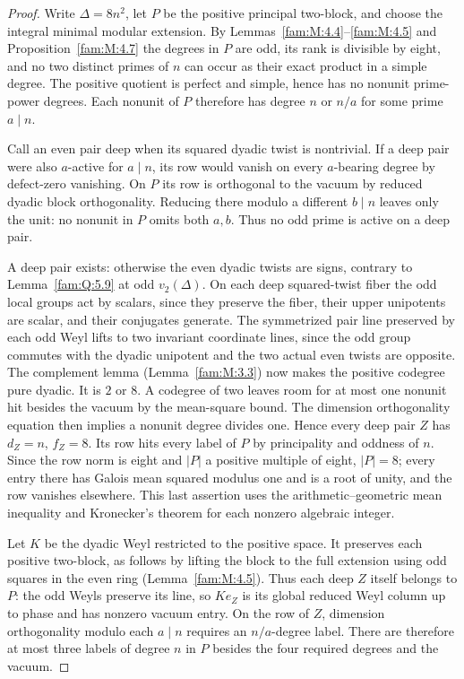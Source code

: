 \documentclass[11pt,a4paper]{article}
\numberwithin{equation}{section}
\theoremstyle{remark}
\begin{document}
\begin{proof}
Write $\Delta=8n^2$, let $P$ be the positive principal two-block,
and choose the integral minimal modular extension. By
Lemmas~\ref{fam:M:4.4}--\ref{fam:M:4.5} and Proposition~\ref{fam:M:4.7} the degrees in
$P$ are odd, its rank is divisible by eight, and no two distinct
primes of $n$ can occur as their exact product in a simple degree.
The positive quotient is perfect and simple, hence has no
nonunit prime-power degrees. Each nonunit of $P$ therefore has
degree $n$ or $n/a$ for some prime $a\mid n$.

Call an even pair deep when its squared dyadic twist is nontrivial.
If a deep pair were also $a$-active for $a\mid n$, its row would
vanish on every $a$-bearing degree by defect-zero vanishing. On
$P$ its row is orthogonal to the vacuum by reduced dyadic block
orthogonality. Reducing there modulo a different $b\mid n$
leaves only the unit: no nonunit in $P$ omits both $a,b$.
Thus no odd prime is active on a deep pair.

A deep pair exists: otherwise the even dyadic twists are signs,
contrary to Lemma~\ref{fam:Q:5.9}
at odd $v_2(\Delta)$. On each deep squared-twist fiber the odd
local groups act by scalars, since they preserve the fiber,
their upper unipotents are scalar, and their conjugates generate.
The symmetrized pair line preserved by each odd Weyl lifts to two
invariant coordinate lines, since the odd group commutes with the
dyadic unipotent and the two actual even twists are opposite.
The complement lemma (Lemma~\ref{fam:M:3.3}) now makes the
positive codegree pure dyadic. It is $2$ or $8$. A codegree of
two leaves room for at most one nonunit hit besides the vacuum
by the mean-square bound. The dimension orthogonality equation
then implies a nonunit degree divides one. Hence every deep pair
$Z$ has $d_Z=n$, $f_Z=8$. Its row hits every label of $P$ by
principality and oddness of $n$. Since the row norm is eight
and $|P|$ a positive multiple of eight, $|P|=8$; every entry
there has Galois mean squared modulus one and is a root of
unity, and the row vanishes elsewhere. This last assertion uses
the arithmetic--geometric mean inequality and Kronecker's
theorem for each nonzero algebraic integer.

Let $K$ be the dyadic Weyl restricted to the positive space.
It preserves each positive two-block, as follows by lifting the
block to the full extension using odd squares in the even ring
(Lemma~\ref{fam:M:4.5}). Thus each deep $Z$ itself belongs to $P$:
the odd Weyls preserve its line, so $K e_Z$ is its global reduced
Weyl column up to phase and has nonzero vacuum entry. On the
row of $Z$, dimension orthogonality modulo each $a\mid n$
requires an $n/a$-degree label. There are therefore at most
three labels of degree $n$ in $P$ besides the four required
degrees and the vacuum.


\end{proof}
\end{document}
